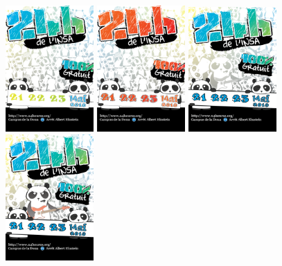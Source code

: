 \begin{figure}[h!]
                \includegraphics[width=0.3\textwidth]{img/preAffiche_panda_2leaf_date2.png}
                \includegraphics[width=0.3\textwidth]{img/preAffiche_panda_2hot.png}
                \includegraphics[width=0.3\textwidth]{img/preAffiche_panda_3.png}
                \includegraphics[width=0.3\textwidth]{img/preAffiche_panda_3-2.png}

\end{figure}
